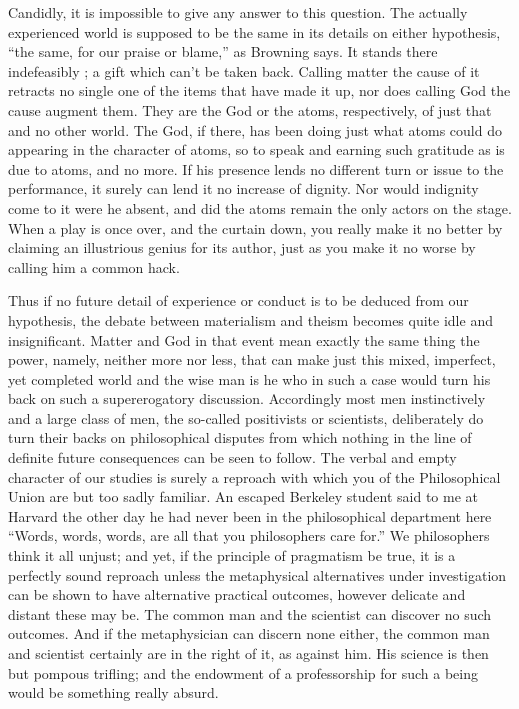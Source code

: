 \documentclass[]{article}
\begin{document}
Candidly, it is impossible to give any answer to this question. The actually experienced world is supposed to be the same in its details on either hypothesis, ``the same, for our praise or blame,'' as Browning says. It stands there indefeasibly ; a gift which can't be taken back. Calling matter the cause of it retracts no single one of the items that have made it up, nor does calling God the cause augment them. They are the God or the atoms, respectively, of just that and no other world. The God, if there, has been doing just what atoms could do appearing in the character of atoms, so to speak and earning such gratitude as is due to atoms, and no more. If his presence lends no different turn or issue to the performance, it surely can lend it no increase of dignity. Nor would indignity come to it were he absent, and did the atoms remain the only actors on the stage. When a play is once over, and the curtain down, you really make it no better by claiming an illustrious genius for its author, just as you make it no worse by calling him a common hack. 

Thus if no future detail of experience or conduct is to be deduced from our hypothesis, the debate between materialism and theism becomes quite idle and insignificant. Matter and God in that event mean exactly the same thing the power, namely, neither more nor less, that can make just this mixed, imperfect, yet completed world and the wise man is he who in such a case would turn his back on such a supererogatory discussion. Accordingly most men instinctively and a large class of men, the so-called positivists or scientists, deliberately do turn their backs on philosophical disputes from which nothing in the line of definite future consequences can be seen to follow. The verbal and empty character of our studies is surely a reproach with which you of the Philosophical Union are but too sadly familiar. An escaped Berkeley student said to me at Harvard the other day he had never been in the philosophical department here ``Words, words, words, are all that you philosophers care for.'' We philosophers think it all unjust; and yet, if the principle of pragmatism be true, it is a perfectly sound reproach unless the metaphysical alternatives under investigation can be shown to have alternative practical outcomes, however delicate and distant these may be. The common man and the scientist can discover no such outcomes. And if the metaphysician can discern none either, the common man and scientist certainly are in the right of it, as against him. His science is then but pompous trifling; and the endowment of a professorship for such a being would be something really absurd. 
\end{document}
